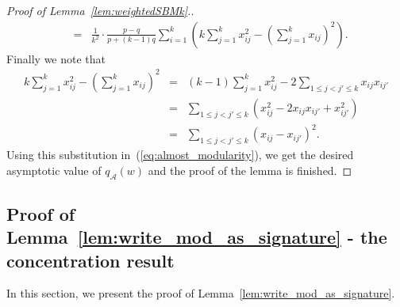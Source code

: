 \documentclass[a4paper,UKenglish,cleveref, autoref, thm-restate,numberwithinsect]{lipics-v2021}
\newcommand{\cA}{\mathcal{A}}
\begin{document}
\begin{proof}[Proof of Lemma~\ref{lem:weightedSBMk}.]
\begin{eqnarray}
&=& \frac {1}{k^2} \cdot \frac {p-q}{p+(k-1)q} \sum_{i=1}^k \left( k \sum_{j=1}^k x_{ij}^2 - \left( \sum_{j=1}^k x_{ij} \right)^2 \right). \label{eq:almost_modularity}
\end{eqnarray}
%
Finally we note that 
%
\begin{eqnarray*}
k \sum_{j=1}^k x_{ij}^2 - \left( \sum_{j=1}^k x_{ij} \right)^2 &=& (k-1) \sum_{j=1}^k x_{ij}^2 - 2 \sum_{1 \le j<j' \le k} x_{ij} x_{ij'} \\
&=& \sum_{1 \le j<j' \le k} \left( x_{ij}^2 - 2 x_{ij} x_{ij'} + x_{ij'}^2 \right) \\
&=& \sum_{1 \le j<j' \le k} \left( x_{ij} - x_{ij'} \right)^2.
\end{eqnarray*}
Using this substitution in~(\ref{eq:almost_modularity}), we get the desired asymptotic value of $q_\cA(w)$ and the proof of the lemma is finished. 
\end{proof}

\subsection{Proof of Lemma~\ref{lem:write_mod_as_signature} - the concentration result}\label{subsec:write_mod_as_signature}
In this section, we present the proof of Lemma~\ref{lem:write_mod_as_signature}.
\end{document}
